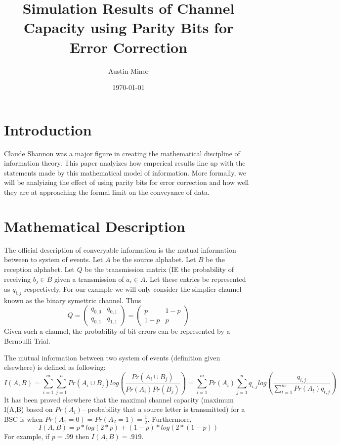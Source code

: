 \documentclass{article}
\author{Austin Minor}
\title{Simulation Results of Channel Capacity using Parity Bits for Error Correction}
\date{\today}
\begin{document}
   \maketitle

   \section{Introduction}
      Claude Shannon was a major figure in creating the
      mathematical discipline of information theory. This
      paper analyizes how emperical results line up with
      the statements made by this mathematical model of
      information. More formally, we will be analyizing
      the effect of using parity bits for error correction
      and how well they are at approaching the formal limit
      on the conveyance of data.
   \section{Mathematical Description}
      The official description of converyable information
      is the mutual information between to system of events.
      Let $A$ be the source alphabet. Let $B$ be the reception
      alphabet. Let $Q$ be the transmission matrix (IE the
      probability of receiving $b_j \in B$ given a transmission
      of $a_i \in A$. Let these entries be represented as $q_{i,j}$
      respectively. For our example we will only consider the
      simplier channel known as the binary symettric channel.
      Thus \[ Q =
      \begin{pmatrix}
         q_{0,0} & q_{0,1} \\
         q_{0,1} & q_{1,1}
      \end{pmatrix}
      =
      \begin{pmatrix}
         p & 1-p \\
         1-p & p
      \end{pmatrix}
      \]
      Given such a channel, the probability of bit errors
      can be represented by a Bernoulli Trial.

      The mutual information between two system of events (definition
      given elsewhere) is defined as following:
      \[
         I(A,B) =
         \sum_{i=1}^{m}
         \sum_{j=1}^{n}
         Pr(A_i \cup B_j) log(\frac{Pr(A_i \cup B_j)}{Pr(A_i)Pr(B_j)})
         =
         \sum_{i=1}^{m}
         Pr(A_i)
         \sum_{j=1}^{n}
         q_{i,j}
         log(\frac{q_{i,j}}{\sum_{t=1}^{m} Pr(A_t) q_{t,j}})
      \]
      It has been proved elsewhere that the maximal channel capacity
      (maximum I(A,B) based on $Pr(A_i) $-- probability that a source letter
      is transmitted) for a BSC is when $Pr(A_1=0)=Pr(A_2=1)=\frac{1}{2}$.
      Furthermore, 
      \[
      I(A,B) = p*log(2*p) + (1-p)*log(2*(1-p))
      \]
      For example, if $p = .99$ then $I(A,B) = .919$.
\end{document}
